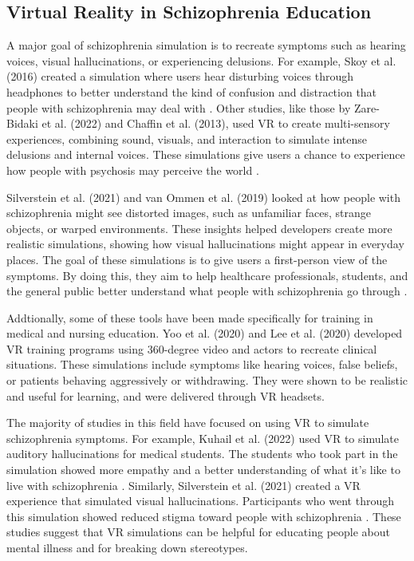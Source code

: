 \subsection{Virtual Reality in Schizophrenia Education}

A major goal of schizophrenia simulation is to recreate symptoms such as hearing voices, visual hallucinations, or experiencing delusions. For example, Skoy et al. (2016) created a simulation where users hear disturbing voices through headphones to better understand the kind of confusion and distraction that people with schizophrenia may deal with \cite{Skoy2016} . Other studies, like those by Zare-Bidaki et al. (2022) and Chaffin et al. (2013), used VR to create multi-sensory experiences, combining sound, visuals, and interaction to simulate intense delusions and internal voices. These simulations give users a chance to experience how people with psychosis may perceive the world \cite{Zare-Bidaki2022,Chaffin2013}.

Silverstein et al. (2021) and van Ommen et al. (2019) looked at how people with schizophrenia might see distorted images, such as unfamiliar faces, strange objects, or warped environments. These insights helped developers create more realistic simulations, showing how visual hallucinations might appear in everyday places. The goal of these simulations is to give users a first-person view of the symptoms. By doing this, they aim to help healthcare professionals, students, and the general public better understand what people with schizophrenia go through \cite{Silverstein2021,Vanommen2019}.

Addtionally, some of these tools have been made specifically for training in medical and nursing education. Yoo et al. (2020) and Lee et al. (2020)  developed VR training programs using 360-degree video and actors to recreate clinical situations\cite{Yoo2020, Lee2020}. These simulations include symptoms like hearing voices, false beliefs, or patients behaving aggressively or withdrawing. They were shown to be realistic and useful for learning, and were delivered through VR headsets.

The majority of studies in this field have focused on using VR to simulate schizophrenia symptoms. For example, Kuhail et al. (2022) used VR to simulate auditory hallucinations for medical students. The students who took part in the simulation showed more empathy and a better understanding of what it’s like to live with schizophrenia \cite{Kuhail2022}. Similarly, Silverstein et al. (2021) created a VR experience that simulated visual hallucinations. Participants who went through this simulation showed reduced stigma toward people with schizophrenia \cite{Silverstein2021}. These studies suggest that VR simulations can be helpful for educating people about mental illness and for breaking down stereotypes. 

